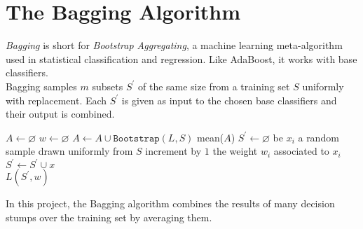 
\chapter{The Bagging Algorithm}

\textit{Bagging} is short for \textit{Bootstrap Aggregating}, a machine learning meta-algorithm used in statistical classification and regression. Like AdaBoost, it works with base classifiers.\\
Bagging samples $m$ subsets $S^{\prime}$ of the same size from a training set $S$ uniformly with replacement. Each $S^{\prime}$ is given as input to the chosen base classifiers and their output is combined.
\begin{algorithm}[htpb]
	\caption{}
	\label{alg:bagging}
	\begin{algorithmic}[1]
		\State $A \gets \varnothing$
		\State $w \gets \varnothing$
		\State $A \gets A \cup \texttt{Bootstrap}(L,S)$
		\EndFor
		\Return mean($A$)
		\EndProcedure
		\State $S^{\prime} \gets \varnothing$
		\State be $x_{i}$ a random sample drawn uniformly from $S$
		\State increment by $1$ the weight $w_{i}$ associated to $x_{i}$
		\State $S^{\prime} \gets S^{\prime} \cup x$
		\EndFor
		\\
		\Return $L(S^{\prime}, w)$
		\EndProcedure
	\end{algorithmic}
\end{algorithm}
In this project, the Bagging algorithm combines the results of many decision stumps over the training set by averaging them.
